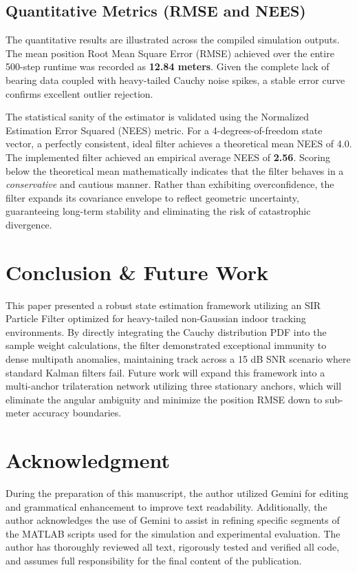 \documentclass[10pt,twocolumn,a4paper]{article}
\begin{document}
\subsection{Quantitative Metrics (RMSE and NEES)}
The quantitative results are illustrated across the compiled simulation outputs. The mean position Root Mean Square Error (RMSE) achieved over the entire 500-step runtime was recorded as \textbf{12.84 meters}. Given the complete lack of bearing data coupled with heavy-tailed Cauchy noise spikes, a stable error curve confirms excellent outlier rejection.

The statistical sanity of the estimator is validated using the Normalized Estimation Error Squared (NEES) metric. For a 4-degrees-of-freedom state vector, a perfectly consistent, ideal filter achieves a theoretical mean NEES of 4.0. The implemented filter achieved an empirical average NEES of \textbf{2.56}. Scoring below the theoretical mean mathematically indicates that the filter behaves in a \textit{conservative} and cautious manner. Rather than exhibiting overconfidence, the filter expands its covariance envelope to reflect geometric uncertainty, guaranteeing long-term stability and eliminating the risk of catastrophic divergence.

\section{Conclusion \& Future Work}
This paper presented a robust state estimation framework utilizing an SIR Particle Filter optimized for heavy-tailed non-Gaussian indoor tracking environments. By directly integrating the Cauchy distribution PDF into the sample weight calculations, the filter demonstrated exceptional immunity to dense multipath anomalies, maintaining track across a 15 dB SNR scenario where standard Kalman filters fail. Future work will expand this framework into a multi-anchor trilateration network utilizing three stationary anchors, which will eliminate the angular ambiguity and minimize the position RMSE down to sub-meter accuracy boundaries.

\section*{Acknowledgment}
During the preparation of this manuscript, the author utilized Gemini for editing and grammatical enhancement to improve text readability. Additionally, the author acknowledges the use of Gemini to assist in refining specific segments of the MATLAB scripts used for the simulation and experimental evaluation. The author has thoroughly reviewed all text, rigorously tested and verified all code, and assumes full responsibility for the final content of the publication.



\end{document}
